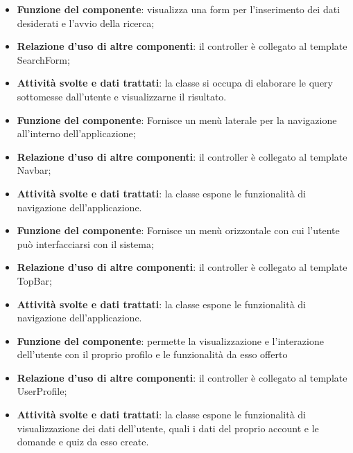 
\begin{itemize}
	\item\textbf{Funzione del componente}: visualizza una form per l’inserimento dei dati desiderati e l’avvio della ricerca;
	\item\textbf{Relazione d'uso di altre componenti}: il controller è collegato al template SearchForm;
	\item\textbf{Attività svolte e dati trattati}: la classe si occupa di elaborare le query sottomesse dall'utente e visualizzarne il risultato.
\end{itemize}


\begin{itemize}
	\item\textbf{Funzione del componente}: Fornisce un menù laterale per la navigazione all'interno dell'applicazione;
	\item\textbf{Relazione d'uso di altre componenti}: il controller è collegato al template Navbar;
	\item\textbf{Attività svolte e dati trattati}: la classe espone le funzionalità di navigazione dell'applicazione.
\end{itemize}


\begin{itemize}
	\item\textbf{Funzione del componente}: Fornisce un menù orizzontale con cui l’utente può interfacciarsi con il sistema;
	\item\textbf{Relazione d'uso di altre componenti}: il controller è collegato al template TopBar;
	\item\textbf{Attività svolte e dati trattati}: la classe espone le funzionalità di navigazione dell'applicazione.
\end{itemize}


\begin{itemize}
	\item\textbf{Funzione del componente}: permette la visualizzazione e l’interazione dell’utente con il proprio profilo e le funzionalità da esso offerto
	\item\textbf{Relazione d'uso di altre componenti}: il controller è collegato al template UserProfile;
	\item\textbf{Attività svolte e dati trattati}: la classe espone le funzionalità di visualizzazione dei dati dell'utente, quali i dati del proprio account e le domande e quiz da esso create.
\end{itemize}

